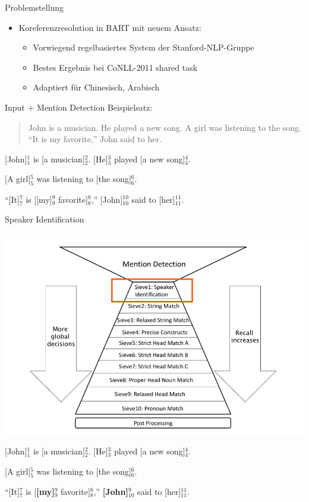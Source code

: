 \documentclass[11pt,a4paper]{beamer}
\author{Xenia Kühling}
\begin{document}
\begin{frame}{Problemstellung}
\begin{itemize}
\item Koreferenzresolution in BART mit neuem Ansatz: 
\begin{itemize}
\item Vorwiegend regelbasiertes System der Stanford-NLP-Gruppe
\item Bestes Ergebnis bei CoNLL-2011 shared task
\item Adaptiert für Chinesisch, Arabisch
\end{itemize}
\end{itemize}
\end{frame}

\begin{frame}{Input + Mention Detection}
Beispielsatz:
\begin{quote}
John is a musician. He played a new song. A girl was listening to the song. “It is my favorite,” John said to her.
\end{quote} 
\bigskip

[John]$^{1}_{1}$ is [a musician]$^{2}_{2}$. [He]$^{3}_{3}$ played [a new song]$^{4}_{4}$.

[A girl]$^{5}_{5}$ was listening to [the song]$^{6}_{6}$.

“[It]$^{7}_{7}$ is [[my]$^{9}_{9}$ favorite]$^{8}_{8}$,” [John]$^{10}_{10}$ said to [her]$^{11}_{11}$.

\end{frame}

\begin{frame}{Speaker Identification}

\includegraphics[scale=0.15]{sieve1.png} 
\bigskip

[John]$^{1}_{1}$ is [a musician]$^{2}_{2}$. [He]$^{3}_{3}$ played [a new song]$^{4}_{4}$.

[A girl]$^{5}_{5}$ was listening to [the song]$^{6}_{6}$.

“[It]$^{7}_{7}$ is [\textbf{[my]}$^{9}_{9}$ favorite]$^{8}_{8}$,” \textbf{[John]$^{9}_{10}$} said to [her]$^{11}_{11}$.

\end{frame}
\end{document}
